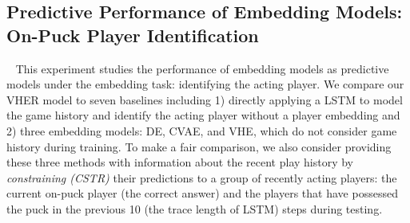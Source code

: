 \documentclass{article}
\begin{document}
\subsection{Predictive Performance of Embedding Models: On-Puck Player Identification}~\label{subsec:identify-player}
This experiment studies the performance of embedding models as predictive models under the embedding task: identifying the acting player. We compare our VHER model to seven baselines including 1) directly applying a LSTM to model the game history and identify the acting player without a player embedding and 2) three embedding models: DE, CVAE, and VHE, which do not consider game history during training. To make a fair comparison, we also consider providing these three methods with information about the recent play history by {\it constraining (CSTR)} their predictions to a group of recently acting players: the current on-puck player (the correct answer) and the players that have possessed the puck in the previous 10 (the trace length of LSTM) steps during testing.

\end{document}
